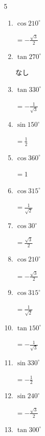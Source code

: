 \begin{multicols}{5}
\begin{enumerate}
  \item $\displaystyle \cos{210^\circ}$

        $\displaystyle =-\frac{\sqrt{3}}{2}$

  \item $\displaystyle \tan{270^\circ}$

        $\displaystyle なし$

  \item $\displaystyle \tan{330^\circ}$

        $\displaystyle =-\frac{1}{\sqrt{3}}$

  \item $\displaystyle \sin{150^\circ}$

        $\displaystyle =\frac{1}{2}$

  \item $\displaystyle \cos{360^\circ}$

        $\displaystyle =1$

  \item $\displaystyle \cos{315^\circ}$

        $\displaystyle =\frac{1}{\sqrt{2}}$

  \item $\displaystyle \cos{30^\circ}$

        $\displaystyle =\frac{\sqrt{3}}{2}$

\columnbreak %

  \item $\displaystyle \cos{210^\circ}$

        $\displaystyle =-\frac{\sqrt{3}}{2}$

  \item $\displaystyle \cos{315^\circ}$

        $\displaystyle =\frac{1}{\sqrt{2}}$

  \item $\displaystyle \tan{150^\circ}$

        $\displaystyle =-\frac{1}{\sqrt{3}}$

  \item $\displaystyle \sin{330^\circ}$

        $\displaystyle =-\frac{1}{2}$

  \item $\displaystyle \sin{240^\circ}$

        $\displaystyle =-\frac{\sqrt{3}}{2}$

  \item $\displaystyle \tan{300^\circ}$


\end{enumerate}
\end{multicols}
